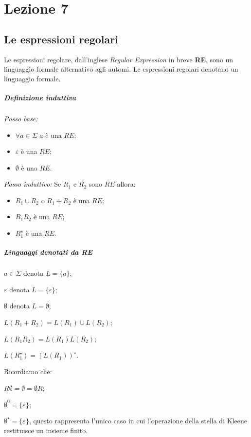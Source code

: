 
\section{Lezione 7}
\subsection{Le espressioni regolari}
Le espressioni regolare, dall'inglese \emph{Regular Expression} in breve \textbf{RE}, sono un linguaggio formale alternativo agli automi. Le espressioni regolari denotano un linguaggio formale.
\subparagraph{Definizione induttiva}
\begin{description}
	\item \emph{Passo base:} 
		\begin{itemize}
			\item $\forall a \in \Sigma$ $a$ \`e una $RE$;
			\item $\varepsilon$ \`e una $RE$;
			\item $\emptyset$ \`e una $RE$.
		\end{itemize}
	\item \emph{Passo induttivo:} Se $R_1$ e $R_2$ sono $RE$ allora:
		\begin{itemize}
			\item $R_1 \cup R_2$ o $R_1 + R_2$ \`e una $RE$;
			\item $R_1R_2$ \`e una $RE$;
			\item $R_1^{\star}$ \`e una $RE$.
		\end{itemize}
\end{description}
\subparagraph{Linguaggi denotati da RE}
	\begin{description}
		\item $a \in \Sigma$ denota $L=\{a\}$;
		\item $\varepsilon$ denota $L=\{\varepsilon\}$;
		\item $\emptyset$ denota $L=\emptyset$;
		\item $L(R_1+R_2) = L(R_1) \cup L(R_2)$;
		\item $L(R_1R_2) = L(R_1)L(R_2)$;
		\item $L(R_1^{\star}) = (L(R_1))^{\star}$.
	\end{description}
Ricordiamo che:
\begin{description}
	\item $R \emptyset = \emptyset = \emptyset R$;
	\item $\emptyset^0 = \{\varepsilon\}$;
	\item $\emptyset^{\star} = \{\varepsilon\}$, questo rappresenta l'unico caso in cui l'operazione della stella di Kleene restituisce un insieme finito.
\end{description}
